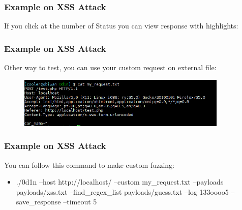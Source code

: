 \documentclass[serif,mathserif]{beamer}
\begin{document}
\begin{frame}
  \frametitle{Example on XSS Attack}
  If you click at the number of Status you can view response with highlights:
  \begin{itemize}
  \begin{figure}[t]    
    \centering
  \end{figure}
 \end{itemize}
\end{frame}



\begin{frame}
  \frametitle{Example on XSS Attack}
  Other way to test, you can use your custom request on external file:
  \begin{itemize}
  \begin{figure}[]    
    \centering
    \includegraphics[width=10cm]{images/custom.png} 
  \end{figure}
 \end{itemize}
\end{frame}



\begin{frame}
  \frametitle{Example on XSS Attack}
  You can follow this command to make custom fuzzing:
  \begin{itemize}
   \item  ./0d1n --host http://localhost/ --custom my\_request.txt --payloads payloads/xss.txt --find\_regex\_list payloads/guess.txt  --log 133oooo5 --save\_response --timeout 5
  \end{itemize}
\end{frame}
\end{document}
